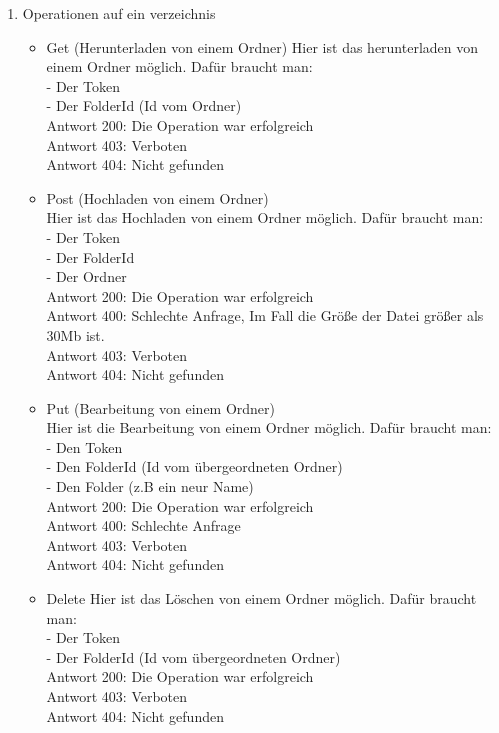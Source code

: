 \begin{enumerate}
\item Operationen auf ein verzeichnis
	\begin{itemize}
	\item Get (Herunterladen von einem Ordner)
Hier ist das herunterladen von einem Ordner m\"oglich. Daf\"ur braucht man: \\
	- Der Token \\
	- Der FolderId (Id vom  Ordner) \\
Antwort 200: Die Operation war erfolgreich \\ 
Antwort 403: Verboten \\
Antwort 404: Nicht gefunden
	\item Post (Hochladen von einem Ordner) \\
Hier ist das Hochladen von einem Ordner m\"oglich. Daf\"ur braucht man: \\
	- Der Token \\
	- Der FolderId \\
	- Der Ordner\\
Antwort 200: Die Operation war erfolgreich \\ 
Antwort 400: Schlechte Anfrage, Im Fall die Gr\"o{\ss}e der Datei gr\"o{\ss}er als 30Mb ist. \\
Antwort 403: Verboten \\
Antwort 404: Nicht gefunden
	\item Put (Bearbeitung von einem Ordner) \\
Hier ist die Bearbeitung von einem Ordner m\"oglich. Daf\"ur braucht man: \\
	- Den Token \\
	- Den FolderId (Id vom \"ubergeordneten Ordner) \\
	- Den Folder (z.B ein neur Name) \\
Antwort 200: Die Operation war erfolgreich \\ 
Antwort 400: Schlechte Anfrage \\
Antwort 403: Verboten \\
Antwort 404: Nicht gefunden
	\item Delete
Hier ist das L\"oschen von einem Ordner m\"oglich. Daf\"ur braucht man: \\
	- Der Token \\
	- Der FolderId (Id vom \"ubergeordneten Ordner) \\
Antwort 200: Die Operation war erfolgreich \\ 
Antwort 403: Verboten \\
Antwort 404: Nicht gefunden
	\end{itemize}
\end{enumerate}